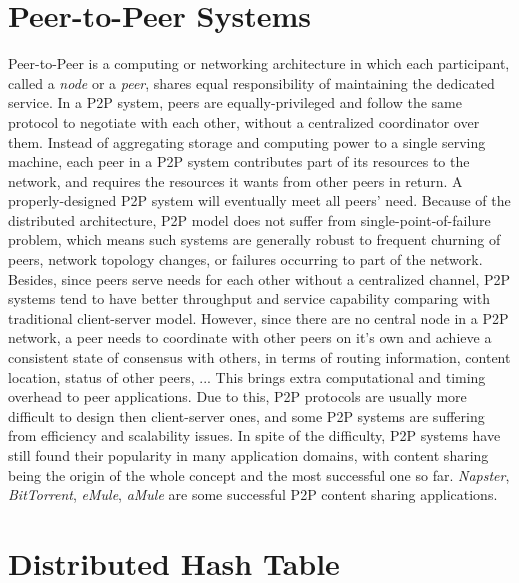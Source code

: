 \section{Peer-to-Peer Systems}
\label{s:peertopeersystems}

Peer-to-Peer is a computing or networking architecture in which each participant, called a \textit{node} or a \textit{peer}, shares equal responsibility of maintaining the dedicated service. In a P2P system, peers are equally-privileged and follow the same protocol to negotiate with each other, without a centralized coordinator over them. Instead of aggregating storage and computing power to a single serving machine, each peer in a P2P system contributes part of its resources to the network, and requires the resources it wants from other peers in return. A properly-designed P2P system will eventually meet all peers' need. Because of the distributed architecture, P2P model does not suffer from single-point-of-failure problem, which means such systems are generally robust to frequent churning of peers, network topology changes, or failures occurring to part of the network. Besides, since peers serve needs for each other without a centralized channel, P2P systems tend to have better throughput and service capability comparing with traditional client-server model. However, since there are no central node in a P2P network, a peer needs to coordinate with other peers on it's own and achieve a consistent state of consensus with others, in terms of routing information, content location, status of other peers, ... This brings extra computational and timing overhead to peer applications. Due to this, P2P protocols are usually more difficult to design then client-server ones, and some P2P systems are suffering from efficiency and scalability issues. In spite of the difficulty, P2P systems have still found their popularity in many application domains, with content sharing being the origin of the whole concept and the most successful one so far. \textit{Napster}\cite{napster}, \textit{BitTorrent}\cite{bittorrent}, \textit{eMule}\cite{emule}, \textit{aMule}\cite{amule} are some successful P2P content sharing applications.

\section{Distributed Hash Table}
\label{s:distributedhashtable}

